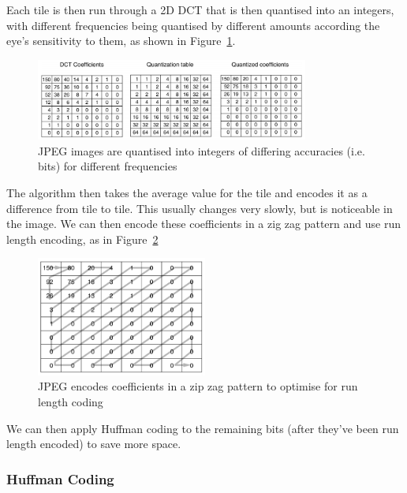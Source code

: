 Each tile is then run through a 2D DCT that is then quantised into an integers,
with different frequencies being quantised by different amounts according the
eye's sensitivity to them, as shown in Figure~\ref{jpeg-quantization}.


\begin{figure}[ht]
  \centering
  \includegraphics[width=0.8\textwidth]{images/jpeg-quantization}
  \caption{JPEG images are quantised into integers of differing accuracies (i.e.
  bits) for different frequencies}
  \label{jpeg-quantization}
\end{figure}

The algorithm then takes the average value for the tile and encodes it as a
difference from tile to tile. This usually changes very slowly, but is noticeable
in the image. We can then encode these coefficients in a zig zag pattern and use
run length encoding, as in Figure~\ref{zig-zag}

\begin{figure}[ht]
  \centering
  \includegraphics[width=0.5\textwidth]{images/zig-zag}
  \caption{JPEG encodes coefficients in a zip zag pattern to optimise for run
  length coding}
  \label{zig-zag}
\end{figure}

We can then apply Huffman coding to the remaining bits (after they've been run
length encoded) to save more space.

\subsubsection{Huffman Coding}

